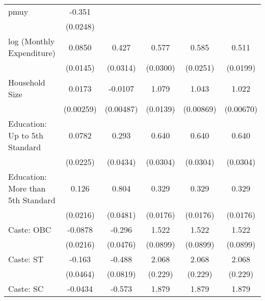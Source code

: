 {\begin{tabular}{l*{5}{c}}
\hline
pmuy                 &      -0.351\sym{***}&                     &                     &                     &                     \\
                    &    (0.0248)         &                     &                     &                     &                     \\
[1em]
log (Monthly Expenditure)&      0.0850\sym{***}&       0.427\sym{***}&       0.577\sym{***}&       0.585\sym{***}&       0.511\sym{***}\\
                    &    (0.0145)         &    (0.0314)         &    (0.0300)         &    (0.0251)         &    (0.0199)         \\
[1em]
Household Size       &      0.0173\sym{***}&     -0.0107\sym{*}  &       1.079\sym{***}&       1.043\sym{***}&       1.022\sym{**} \\
                    &   (0.00259)         &   (0.00487)         &    (0.0139)         &   (0.00869)         &   (0.00670)         \\
[1em]
Education: Up to 5th Standard           &      0.0782\sym{***}&       0.293\sym{***}&       0.640\sym{***}&       0.640\sym{***}&       0.640\sym{***}\\
                     &    (0.0225)         &    (0.0434)         &    (0.0304)         &    (0.0304)         &    (0.0304)         \\
[1em]
Education: More than 5th Standard      &       0.126\sym{***}&       0.804\sym{***}&          0.329\sym{***}&       0.329\sym{***}&       0.329\sym{***}\\
                    &    (0.0216)         &    (0.0481)         &    (0.0176)         &    (0.0176)         &    (0.0176)         \\
[1em]
Caste: OBC             &     -0.0878\sym{***}&      -0.296\sym{***}&       1.522\sym{***}&       1.522\sym{***}&       1.522\sym{***}\\
                   &    (0.0216)         &    (0.0476)           &    (0.0899)         &    (0.0899)         &    (0.0899)         \\
[1em]
Caste: ST         &      -0.163\sym{***}&      -0.488\sym{***} &       2.068\sym{***}&       2.068\sym{***}&       2.068\sym{***}\\
                    &    (0.0464)         &    (0.0819)         &     (0.229)         &     (0.229)         &     (0.229)         \\
Caste: SC             &     -0.0434         &      -0.573\sym{***} &       1.879\sym{***}&       1.879\sym{***}&       1.879\sym{***}\\

\end{tabular}}
